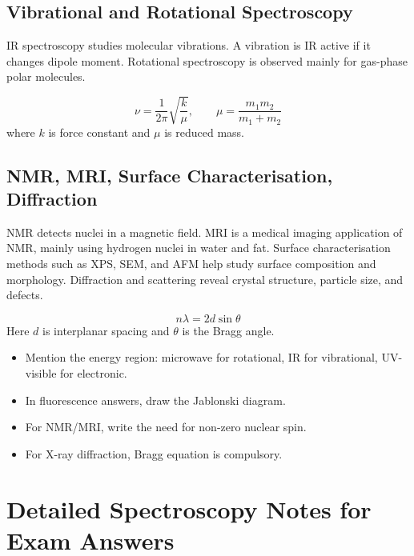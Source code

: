 \documentclass[12pt,a4paper]{article}
\begin{document}
\subsection{Vibrational and Rotational Spectroscopy}
IR spectroscopy studies molecular vibrations. A vibration is IR active if it changes dipole moment. Rotational spectroscopy is observed mainly for gas-phase polar molecules.

\begin{tcolorbox}[formulabox, title={Vibrational Frequency of a Diatomic Molecule}]
\[
\nu=\frac{1}{2\pi}\sqrt{\frac{k}{\mu}},\qquad
\mu=\frac{m_1m_2}{m_1+m_2}
\]
where $k$ is force constant and $\mu$ is reduced mass.
\end{tcolorbox}

\subsection{NMR, MRI, Surface Characterisation, Diffraction}
NMR detects nuclei in a magnetic field. MRI is a medical imaging application of NMR, mainly using hydrogen nuclei in water and fat. Surface characterisation methods such as XPS, SEM, and AFM help study surface composition and morphology. Diffraction and scattering reveal crystal structure, particle size, and defects.

\begin{tcolorbox}[formulabox, title={Bragg Equation}]
\[
n\lambda=2d\sin\theta
\]
Here $d$ is interplanar spacing and $\theta$ is the Bragg angle.
\end{tcolorbox}

\begin{tcolorbox}[exambox, title={Exam Points}]
\begin{itemize}[leftmargin=*, itemsep=2pt, topsep=2pt]
  \item Mention the energy region: microwave for rotational, IR for vibrational, UV-visible for electronic.
  \item In fluorescence answers, draw the Jablonski diagram.
  \item For NMR/MRI, write the need for non-zero nuclear spin.
  \item For X-ray diffraction, Bragg equation is compulsory.
\end{itemize}
\end{tcolorbox}

\section{Detailed Spectroscopy Notes for Exam Answers}
\end{document}
